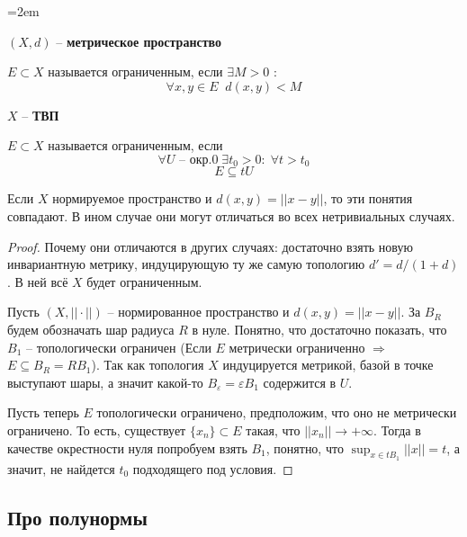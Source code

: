 \documentclass[12pt, a4paper, oneside]{book}
\begin{document}
\begin{minipage}[t]{50mm}\parindent=2em
\begin{center}
$(X,d)$ -- \textbf{метрическое пространство}
\end{center}
    $E \subset X$ называется ограниченным, если $\exists M > 0$ :\\
    $$\forall x, y \in E \; \; d(x,y) < M$$
\end{minipage}
\hfill
\begin{minipage}[t]{50mm}
\begin{center}
   $X$ -- \textbf{ТВП}
\end{center}
    $E \subset X$ называется ограниченным, если \\
    $$\forall U \text{ -- окр.} 0 \; \exists t_0 > 0 : \; \forall t > t_0 $$
$$ E \subseteq tU $$
\end{minipage}
\begin{lemma}
Если $X$ нормируемое пространство и $d(x, y) = ||x-y||$, то эти понятия совпадают. В ином случае они могут отличаться во всех нетривиальных случаях.
\end{lemma}
\begin{proof}
Почему они отличаются в других случаях: достаточно взять новую инвариантную метрику, индуцирующую ту же самую топологию $d' = d/(1+d)$. В ней всё $X$ будет ограниченным.

    Пусть $(X, || \cdot ||)$ -- нормированное пространство и $d(x,y) = ||x-y||$. За $B_R$ будем обозначать шар радиуса $R$ в нуле.
    Понятно, что достаточно показать, что $B_1$ -- топологически ограничен (Если $E$ метрически ограниченно $\Rightarrow$ $E \subseteq B_R = R B_1$).
    Так как топология $X$ индуцируется метрикой, базой в точке выступают шары, а значит какой-то $B_\varepsilon = \varepsilon B_1$ содержится в $U$.

    Пусть теперь $E$ топологически ограничено, предположим, что оно не метрически ограничено.
    То есть, существует $\{x_n\} \subset E$ такая, что $||x_n|| \to +\infty$. Тогда в качестве окрестности нуля попробуем взять $B_1$, понятно, что $\sup_{x \in tB_1} ||x|| = t$, а значит, не найдется $t_0$ подходящего под условия.
\end{proof}


\subsection{Про полунормы}
\end{document}
